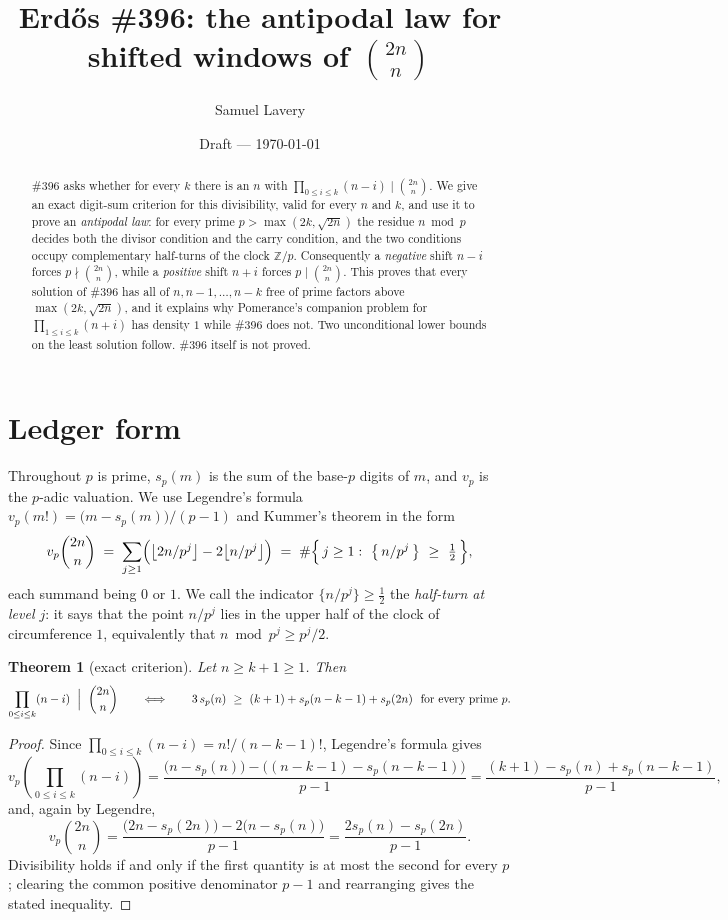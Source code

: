 \documentclass[11pt]{article}
\title{Erd\H{o}s \#396: the antipodal law for shifted windows of
$\binom{2n}{n}$}
\author{Samuel Lavery}
\date{Draft --- \today}
\newtheorem{theorem}{Theorem}
\begin{document}
\maketitle

\begin{abstract}
\#396 asks whether for every $k$ there is an $n$ with
$\prod_{0\le i\le k}(n-i)\mid\binom{2n}{n}$.  We give an exact digit-sum criterion for
this divisibility, valid for every $n$ and $k$, and use it to prove an
\emph{antipodal law}: for every prime $p>\max(2k,\sqrt{2n})$ the residue $n\bmod p$ decides
both the divisor condition and the carry condition, and the two conditions occupy
complementary half-turns of the clock $\mathbb Z/p$.  Consequently a \emph{negative} shift
$n-i$ forces $p\nmid\binom{2n}{n}$, while a \emph{positive} shift $n+i$ forces
$p\mid\binom{2n}{n}$.  This proves that every solution of \#396 has all of
$n,n-1,\dots,n-k$ free of prime factors above $\max(2k,\sqrt{2n})$, and it explains why
Pomerance's companion problem for $\prod_{1\le i\le k}(n+i)$ has density $1$ while \#396
does not.  Two unconditional lower bounds on the least solution follow.
\#396 itself is not proved.
\end{abstract}

\section{Ledger form}

Throughout $p$ is prime, $s_p(m)$ is the sum of the base-$p$ digits of $m$, and
$v_p$ is the $p$-adic valuation.  We use Legendre's formula
$v_p(m!)=\bigl(m-s_p(m)\bigr)/(p-1)$ and Kummer's theorem in the form
\[
  v_p\binom{2n}{n}\;=\;\sum_{j\ge1}\Bigl(\bigl\lfloor 2n/p^{j}\bigr\rfloor
      -2\bigl\lfloor n/p^{j}\bigr\rfloor\Bigr)
  \;=\;\#\Bigl\{\,j\ge1:\ \bigl\{\,n/p^{j}\,\bigr\}\ \ge\ \tfrac12\,\Bigr\},
\]
each summand being $0$ or $1$.  We call the indicator $\{n/p^{j}\}\ge\frac12$ the
\emph{half-turn at level $j$}: it says that the point $n/p^{j}$ lies in the upper half of
the clock of circumference $1$, equivalently that $n\bmod p^{j}\ge p^{j}/2$.

\begin{theorem}[exact criterion]\label{thm:crit}
Let $n\ge k+1\ge1$.  Then
\[
  \prod_{0\le i\le k}(n-i)\ \Bigm|\ \binom{2n}{n}
  \qquad\Longleftrightarrow\qquad
  3\,s_p(n)\ \ge\ (k+1)+s_p(n-k-1)+s_p(2n)\ \ \text{for every prime }p .
\]
\end{theorem}

\begin{proof}
Since $\prod_{0\le i\le k}(n-i)=n!/(n-k-1)!$, Legendre's formula gives
\[
  v_p\!\left(\prod_{0\le i\le k}(n-i)\right)
  =\frac{\bigl(n-s_p(n)\bigr)-\bigl((n-k-1)-s_p(n-k-1)\bigr)}{p-1}
  =\frac{(k+1)-s_p(n)+s_p(n-k-1)}{p-1},
\]
and, again by Legendre,
\[
  v_p\binom{2n}{n}=\frac{\bigl(2n-s_p(2n)\bigr)-2\bigl(n-s_p(n)\bigr)}{p-1}
  =\frac{2s_p(n)-s_p(2n)}{p-1}.
\]
Divisibility holds if and only if the first quantity is at most the second for every $p$;
clearing the common positive denominator $p-1$ and rearranging gives the stated
inequality.
\end{proof}
\end{document}
